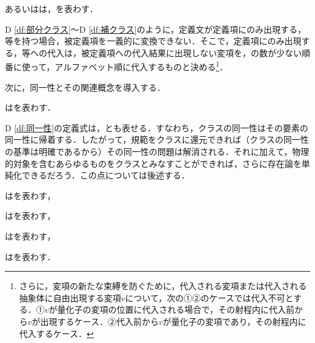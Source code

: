 \begin{df}[補クラス]
\label{df:補クラス}
\kagi{$\bar{\alpha}$}あるいは\kagi{$\barl{\alpha}$}は，を表わす．
\end{df}

D \ref{df:部分クラス}〜D \ref{df:補クラス}のように，定義文が定義項にのみ出現する，等を持つ場合，被定義項を一義的に変換できない．そこで，定義項にのみ出現する，等への代入は，被定義項への代入結果に出現しない変項を，の数が少ない順番に使って，アルファベット順に代入するものと決める\footnote{
    さらに，変項の新たな束縛を防ぐために，代入される変項または代入される抽象体に自由出現する変項$v$について，次の①②のケースでは代入不可とする．①$v$が量化子の変項の位置に代入される場合で，その射程内に代入前から$v$が出現するケース．②代入前から$v$が量化子の変項であり，その射程内に代入するケース．
}．

次に，同一性とその関連概念を導入する．

\begin{df}[同一性]
\label{df:同一性}
\kagi{$
    \alpha = \beta
$}は\kagi{$
    \alpha\subseteq\beta\subseteq\alpha
$}を表わす．
\end{df}
\noindent D \ref{df:同一性}の定義式は，とも表せる．すなわち，クラスの同一性はその要素の同一性に帰着する．したがって，規範をクラスに還元できれば（クラスの同一性の基準は明確であるから）その同一性の問題は解消される．それに加えて，物理的対象を含むあらゆるものをクラスとみなすことができれば，さらに存在論を単純化できるだろう．この点については後述する．

\begin{df}[空クラス]
\label{df:空クラス}
\kagi{$
    \Lambda
$}はを表わす，
\end{df}

\begin{df}[普遍クラス]
\label{df:普遍クラス}
\kagi{$
    \univ
$}はを表わす，
\end{df}

\begin{df}[単一クラス]
\label{df:単一クラス}
\kagi{$
    \classab{\alpha}
$}はを表わす，
\end{df}

\begin{df}[対クラス]
\label{df:対クラス}
\kagi{$
    \classab{\alpha,\beta}
$}は\kagi{$
    \classab{\alpha}\cup\classab{\beta}
$}を表わす．
\end{df}

